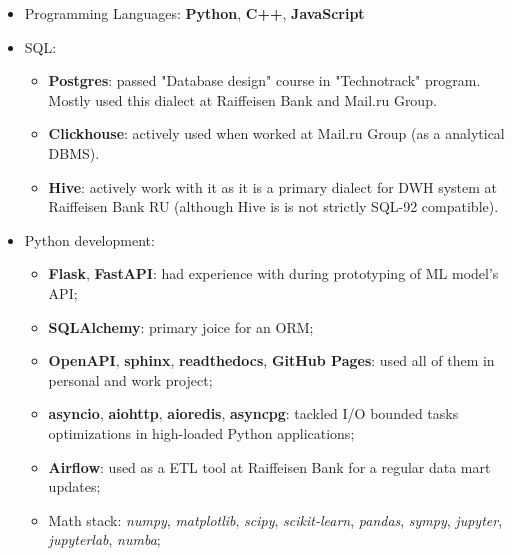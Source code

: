 
\begin{itemize}
	\item Programming Languages:
    \textbf{Python}, \textbf{C++}, \textbf{JavaScript}
    \item SQL: 
        \begin{itemize}
            \item \textbf{Postgres}: passed "Database design" course in "Technotrack" program. Mostly used this dialect at Raiffeisen Bank and Mail.ru Group.
            \item \textbf{Clickhouse}: actively used when worked at Mail.ru Group (as a analytical DBMS).
            \item \textbf{Hive}: actively work with it as it is a primary dialect for DWH system at Raiffeisen Bank RU (although Hive is is not strictly SQL-92 compatible).
        \end{itemize}
    \item Python development: 
        \begin{itemize}
            \item \textbf{Flask}, \textbf{FastAPI}: had experience with during prototyping of ML model's API;
            \item \textbf{SQLAlchemy}: primary joice for an ORM;
            \item \textbf{OpenAPI}, \textbf{sphinx}, \textbf{readthedocs}, \textbf{GitHub Pages}: used all of them in personal and work project;
            \item \textbf{asyncio}, \textbf{aiohttp}, \textbf{aioredis}, \textbf{asyncpg}: tackled I/O bounded tasks optimizations in high-loaded Python applications;
            \item \textbf{Airflow}: used as a ETL tool at Raiffeisen Bank for a regular data mart updates;
            \item Math stack: \textit{numpy}, \textit{matplotlib}, \textit{scipy}, \textit{scikit-learn}, \textit{pandas}, \textit{sympy}, \textit{jupyter}, \textit{jupyterlab}, \textit{numba};

\end{itemize}
\end{itemize}

